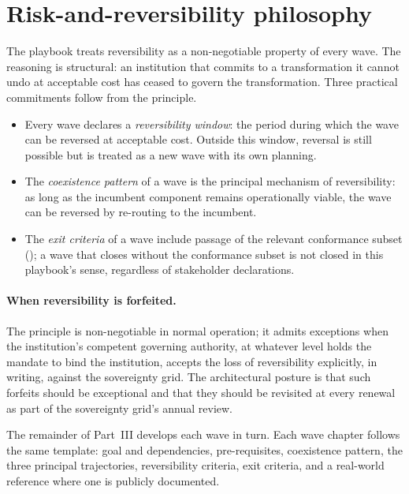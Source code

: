 \section{Risk-and-reversibility philosophy}
\label{sec:pr-philosophy}

The playbook treats reversibility as a non-negotiable property of
every wave. The reasoning is structural: an institution that
commits to a transformation it cannot undo at acceptable cost has
ceased to govern the transformation. Three practical commitments
follow from the principle.

\begin{itemize}[leftmargin=1.5em,nosep]
  \item Every wave declares a \emph{reversibility window}: the
    period during which the wave can be reversed at acceptable
    cost. Outside this window, reversal is still possible but is
    treated as a new wave with its own planning.
  \item The \emph{coexistence pattern} of a wave is the principal
    mechanism of reversibility: as long as the incumbent component
    remains operationally viable, the wave can be reversed by
    re-routing to the incumbent.
  \item The \emph{exit criteria} of a wave include passage of the
    relevant conformance subset (); a
    wave that closes without the conformance subset is not
    closed in this playbook's sense, regardless of stakeholder
    declarations.
\end{itemize}

\paragraph{When reversibility is forfeited.} The principle is
non-negotiable in normal operation; it admits exceptions when the
institution's competent governing authority, at whatever level
holds the mandate to bind the institution, accepts the loss of
reversibility explicitly, in writing, against the sovereignty grid. The
architectural posture is that such forfeits should be exceptional
and that they should be revisited at every renewal as part of the
sovereignty grid's annual review.

\medskip

\noindent The remainder of Part~III develops each wave in turn.
Each wave chapter follows the same template: goal and dependencies,
pre-requisites, coexistence pattern, the three principal
trajectories, reversibility criteria, exit criteria, and a
real-world reference where one is publicly documented.
